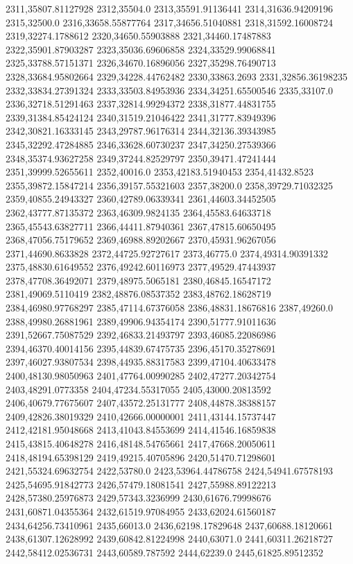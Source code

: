 2311,35807.81127928
2312,35504.0
2313,35591.91136441
2314,31636.94209196
2315,32500.0
2316,33658.55877764
2317,34656.51040881
2318,31592.16008724
2319,32274.1788612
2320,34650.55903888
2321,34460.17487883
2322,35901.87903287
2323,35036.69606858
2324,33529.99068841
2325,33788.57151371
2326,34670.16896056
2327,35298.76490713
2328,33684.95802664
2329,34228.44762482
2330,33863.2693
2331,32856.36198235
2332,33834.27391324
2333,33503.84953936
2334,34251.65500546
2335,33107.0
2336,32718.51291463
2337,32814.99294372
2338,31877.44831755
2339,31384.85424124
2340,31519.21046422
2341,31777.83949396
2342,30821.16333145
2343,29787.96176314
2344,32136.39343985
2345,32292.47284885
2346,33628.60730237
2347,34250.27539366
2348,35374.93627258
2349,37244.82529797
2350,39471.47241444
2351,39999.52655611
2352,40016.0
2353,42183.51940453
2354,41432.8523
2355,39872.15847214
2356,39157.55321603
2357,38200.0
2358,39729.71032325
2359,40855.24943327
2360,42789.06339341
2361,44603.34452505
2362,43777.87135372
2363,46309.9824135
2364,45583.64633718
2365,45543.63827711
2366,44411.87940361
2367,47815.60650495
2368,47056.75179652
2369,46988.89202667
2370,45931.96267056
2371,44690.8633828
2372,44725.92727617
2373,46775.0
2374,49314.90391332
2375,48830.61649552
2376,49242.60116973
2377,49529.47443937
2378,47708.36492071
2379,48975.5065181
2380,46845.16547172
2381,49069.5110419
2382,48876.08537352
2383,48762.18628719
2384,46980.97768297
2385,47114.67376058
2386,48831.18676816
2387,49260.0
2388,49980.26881961
2389,49906.94354174
2390,51777.91011636
2391,52667.75087529
2392,46833.21493797
2393,46085.22086986
2394,46370.40014156
2395,44839.67475735
2396,45170.35278691
2397,46027.93807534
2398,44935.88317583
2399,47104.40633478
2400,48130.98050963
2401,47764.00990285
2402,47277.20342754
2403,48291.0773358
2404,47234.55317055
2405,43000.20813592
2406,40679.77675607
2407,43572.25131777
2408,44878.38388157
2409,42826.38019329
2410,42666.00000001
2411,43144.15737447
2412,42181.95048668
2413,41043.84553699
2414,41546.16859838
2415,43815.40648278
2416,48148.54765661
2417,47668.20050611
2418,48194.65398129
2419,49215.40705896
2420,51470.71298601
2421,55324.69632754
2422,53780.0
2423,53964.44786758
2424,54941.67578193
2425,54695.91842773
2426,57479.18081541
2427,55988.89122213
2428,57380.25976873
2429,57343.3236999
2430,61676.79998676
2431,60871.04355364
2432,61519.97084955
2433,62024.61560187
2434,64256.73410961
2435,66013.0
2436,62198.17829648
2437,60688.18120661
2438,61307.12628992
2439,60842.81224998
2440,63071.0
2441,60311.26218727
2442,58412.02536731
2443,60589.787592
2444,62239.0
2445,61825.89512352
